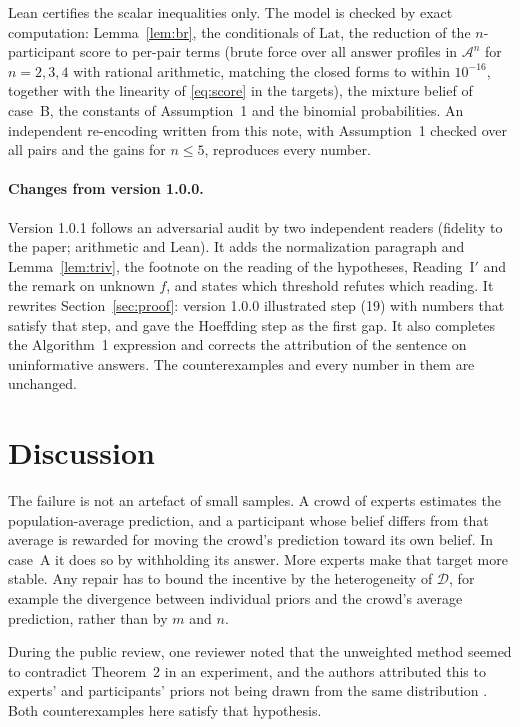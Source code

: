 \documentclass[11pt]{article}
\theoremstyle{remark}
\newcommand{\cD}{\mathcal{D}}
\newcommand{\cA}{\mathcal{A}}
\newcommand{\Lat}{\mathrm{Lat}}
\begin{document}
Lean certifies the scalar inequalities only. The model is checked by exact computation: Lemma~\ref{lem:br}, the conditionals of $\Lat$, the reduction of the $n$-participant score to per-pair terms (brute force over all answer profiles in $\cA^n$ for $n=2,3,4$ with rational arithmetic, matching the closed forms to within $10^{-16}$, together with the linearity of \eqref{eq:score} in the targets), the mixture belief of case~B, the constants of Assumption~1 and the binomial probabilities. An independent re-encoding written from this note, with Assumption~1 checked over all pairs and the gains for $n\le5$, reproduces every number.

\paragraph{Changes from version 1.0.0.} Version 1.0.1 follows an adversarial audit by two independent readers (fidelity to the paper; arithmetic and Lean). It adds the normalization paragraph and Lemma~\ref{lem:triv}, the footnote on the reading of the hypotheses, Reading~I$'$ and the remark on unknown $f$, and states which threshold refutes which reading. It rewrites Section~\ref{sec:proof}: version 1.0.0 illustrated step (19) with numbers that satisfy that step, and gave the Hoeffding step as the first gap. It also completes the Algorithm~1 expression and corrects the attribution of the sentence on uninformative answers. The counterexamples and every number in them are unchanged.

\section{Discussion}

The failure is not an artefact of small samples. A crowd of experts estimates the population-average prediction, and a participant whose belief differs from that average is rewarded for moving the crowd's prediction toward its own belief. In case~A it does so by withholding its answer. More experts make that target more stable. Any repair has to bound the incentive by the heterogeneity of $\cD$, for example the divergence between individual priors and the crowd's average prediction, rather than by $m$ and $n$.

During the public review, one reviewer noted that the unweighted method seemed to contradict Theorem~2 in an experiment, and the authors attributed this to experts' and participants' priors not being drawn from the same distribution \citep{openreview2026forum}. Both counterexamples here satisfy that hypothesis.
\end{document}
